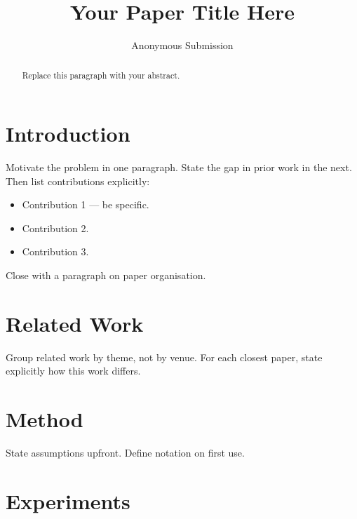 \documentclass[letterpaper]{article} %
\title{Your Paper Title Here}
\author{
    Anonymous Submission
}
\begin{document}
\maketitle

\begin{abstract}
Replace this paragraph with your abstract.
\end{abstract}

\section{Introduction}

Motivate the problem in one paragraph. State the gap in prior work in the
next. Then list contributions explicitly:

\begin{itemize}
    \item Contribution 1 --- be specific.
    \item Contribution 2.
    \item Contribution 3.
\end{itemize}

Close with a paragraph on paper organisation.

\section{Related Work}

Group related work by theme, not by venue. For each closest paper, state
explicitly how this work differs.

\section{Method}

State assumptions upfront. Define notation on first use.

\section{Experiments}
\end{document}

